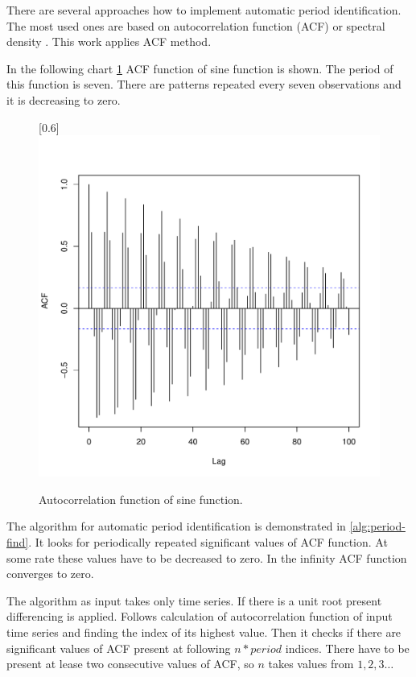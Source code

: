     There are several approaches how to implement automatic period identification. The most used ones are based on
    autocorrelation function (ACF) or spectral density \cite{period-hydman}. This work applies ACF method.

    In the following chart \ref{img:period-acf} ACF function of sine function is shown. The period of this
    function is seven. There are patterns repeated every seven observations and it is decreasing to zero.

    \begin{figure}[H]
        \begin{center}
            \scalebox{0.73}[0.6]{\includegraphics{img/acf-sine.pdf}}
            \caption{Autocorrelation function of sine function.}
            \label{img:period-acf}
        \end{center}
    \end{figure}

    The algorithm for automatic period identification is demonstrated in \ref{alg:period-find}.
    It looks for periodically repeated significant values of ACF function. At some rate these values have to
    be decreased to zero. In the infinity ACF function converges to zero.

    The algorithm as input takes only time series. If there is a unit root present differencing is applied.
    Follows calculation of autocorrelation function of input time series and finding the index of its highest
    value. Then it checks if there are significant values of ACF present at following $n*period$ indices.
    There have to be present at lease two consecutive values of ACF, so $n$ takes values from $1,2,3\dots$

